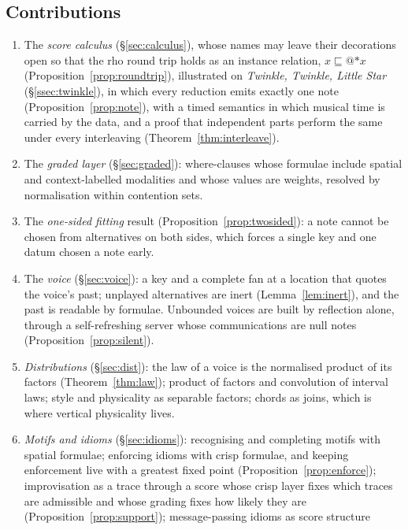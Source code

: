 \documentclass[11pt,a4paper]{article}
\theoremstyle{plain}
\theoremstyle{definition}
\theoremstyle{remark}
\newcommand{\rhoc}{\textsf{rho}}
\newcommand{\drop}{{*}}
\newcommand{\gen}{\sqsubseteq}
\begin{document}
\subsection{Contributions}

\begin{enumerate}[leftmargin=*,itemsep=2pt]
\item The \emph{score calculus} (\S\ref{sec:calculus}), whose names may leave
  their decorations open so that the \rhoc{} round trip holds as an instance
  relation, $x \gen @{\drop x}$ (Proposition~\ref{prop:roundtrip}), illustrated on
  \emph{Twinkle, Twinkle, Little Star} (\S\ref{ssec:twinkle}), in which every reduction
  emits exactly one note (Proposition~\ref{prop:note}), with a timed semantics
  in which musical time is carried by the data, and a proof that independent
  parts perform the same under every interleaving (Theorem~\ref{thm:interleave}).
\item The \emph{graded layer} (\S\ref{sec:graded}): where-clauses whose formulae
  include spatial and context-labelled modalities and whose values are weights,
  resolved by normalisation within contention sets.
\item The \emph{one-sided fitting} result (Proposition~\ref{prop:twosided}): a
  note cannot be chosen from alternatives on both sides, which forces a single
  key and one datum chosen a note early.
\item The \emph{voice} (\S\ref{sec:voice}): a key and a complete fan at a
  location that quotes the voice's past; unplayed alternatives are inert
  (Lemma~\ref{lem:inert}), and the past is readable by formulae. Unbounded
  voices are built by reflection alone, through a self-refreshing server whose
  communications are null notes (Proposition~\ref{prop:silent}).
\item \emph{Distributions} (\S\ref{sec:dist}): the law of a voice is the
  normalised product of its factors (Theorem~\ref{thm:law}); product of factors
  and convolution of interval laws; style and physicality as separable factors;
  chords as joins, which is where vertical physicality lives.
\item \emph{Motifs and idioms} (\S\ref{sec:idioms}): recognising and completing
  motifs with spatial formulae; enforcing idioms with crisp formulae, and
  keeping enforcement live with a greatest fixed point
  (Proposition~\ref{prop:enforce}); improvisation as a trace through a score
  whose crisp layer fixes which traces are admissible and whose grading fixes
  how likely they are (Proposition~\ref{prop:support}); message-passing idioms as score structure

\end{enumerate}
\end{document}
